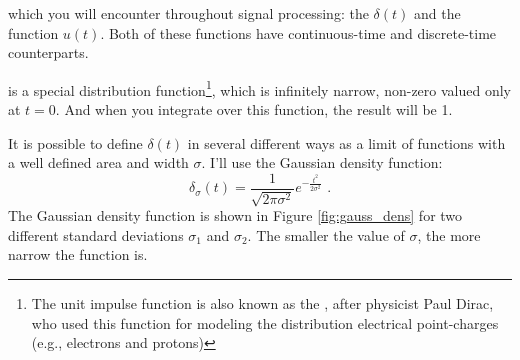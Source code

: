 %
% 
%
 which you will encounter throughout signal processing: the \emph{} $\delta(t)$ and the \emph{} function $u(t)$. Both of these functions have continuous-time and discrete-time counterparts.

 is a special distribution function\footnote{The unit impulse function is also known as the \emph{}, after physicist Paul Dirac, who used this function for modeling the distribution electrical point-charges (e.g., electrons and protons)}, which is infinitely narrow, non-zero valued only at $t=0$. And when you integrate over this function, the result will be 1.

It is possible to define $\delta(t)$ in several different ways as a limit of functions with a well defined area and width $\sigma$. I'll use the Gaussian density function:
\begin{equation}
\delta_\sigma(t) = \frac{1}{\sqrt{2\pi \sigma^2}}e^{-\frac{t^2}{2\sigma^2}}\,\,.
\end{equation}
The Gaussian density function is shown in Figure \ref{fig:gauss_dens} for two different standard deviations $\sigma_1$ and $\sigma_2$. The smaller the value of $\sigma$, the more narrow the function is.

